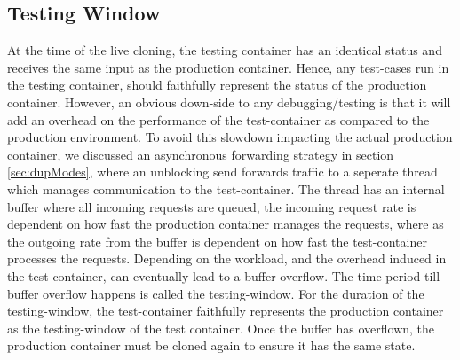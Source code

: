\subsection{Testing Window}
\label{sec:window}

At the time of the live cloning, the testing container has an identical status and receives the same input as the production container. 
Hence, any test-cases run in the testing container, should faithfully represent the status of the production container.
However, an obvious down-side to any debugging/testing is that it will add an overhead on the performance of the test-container as compared to the production environment.
To avoid this slowdown impacting the actual production container, we discussed an asynchronous forwarding strategy in section \ref{sec:dupModes}, where an unblocking send forwards traffic to a seperate thread which manages communication to the test-container. 
The thread has an internal buffer where all incoming requests are queued, the incoming request rate is dependent on how fast the production container manages the requests, where as the outgoing rate from the buffer is dependent on how fast the test-container processes the requests.
Depending on the workload, and the overhead induced in the test-container, can eventually lead to a buffer overflow. 
The time period till buffer overflow happens is called the testing-window.
For the duration of the testing-window, the test-container faithfully represents the production container as the testing-window of the test container. 
Once the buffer has overflown, the production container must be cloned again to ensure it has the same state.

